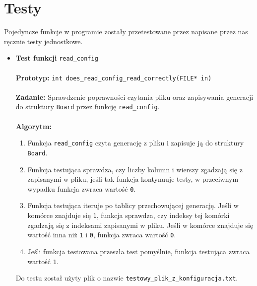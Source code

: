 \documentclass[12pt,a4paper,notitlepage]{report}
\begin{document}
\section{Testy}
Pojedyncze funkcje w programie zostały przetestowane przez napisane przez nas ręcznie testy jednostkowe.
\begin{itemize}
	\item\textbf {Test funkcji} \verb|read_config|\\
	\\
	\textbf{Prototyp:} \verb|int does_read_config_read_correctly(FILE* in)|\\
	\\
	\textbf{Zadanie:} Sprawdzenie poprawności czytania pliku oraz zapisywania generacji do struktury \verb|Board| przez funkcję \verb|read_config|.\\
	\\
	\textbf{Algorytm:}
	\begin{enumerate}
	\item Funkcja \verb|read_config| czyta generację z pliku i zapisuje ją do struktury \verb|Board|.
	\item Funkcja testująca sprawdza, czy liczby kolumn i wierszy zgadzają się z zapisanymi w pliku, jeśli tak funkcja kontynuuje testy, w przeciwnym wypadku funkcja zwraca wartość \verb|0|.
	\item Funkcja testująca iteruje po tablicy przechowującej generację. Jeśli w komórce znajduje się \verb|1|, funkcja sprawdza, czy indeksy tej komórki zgadzają się z indeksami zapisanymi w pliku. Jeśli w komórce znajduje się wartość inna niż \verb|1| i \verb|0|, funkcja zwraca wartość \verb|0|.
	\item Jeśli funkcja testowana przeszła test pomyślnie, funkcja testująca zwraca wartość \verb|1|.
	\end{enumerate}

	Do testu został użyty plik o nazwie \verb|testowy_plik_z_konfiguracja.txt|.\\
	

\end{itemize}
\end{document}
